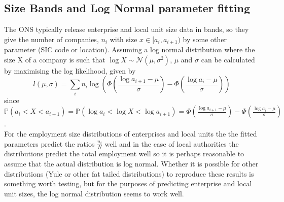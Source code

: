 \documentclass[a4paper,10pt]{article}
\begin{document}
\subsection{Size Bands and Log Normal parameter fitting}
\label{ONS size dist parameter fitting}
The ONS typically release enterprise and local unit size data in bands, so they give the number of companies, $n_i$ with size $x \in [a_i, a_{i+1})$ by some other parameter (SIC code or location). Assuming a log normal distribution where the size X of a company is such that $\log X \sim \mathcal{N}(\mu, \sigma^2)$, $\mu$ and $\sigma$ can be calculated by maximising the log likelihood, given by
\begin{equation}
 l(\mu, \sigma) = \sum_i n_i \log \left( \Phi \left( \frac{\log a_{i + 1} - \mu}{\sigma} \right) - \Phi \left( \frac{\log a_{i} - \mu}{\sigma} \right) \right)
\end{equation}
since $\mathbb{P}(a_i < X < a_{i + 1}) = \mathbb{P}(\log a_i < \log X < \log a_{i + 1}) = \Phi \left( \frac{\log a_{i + 1} - \mu}{\sigma} \right) - \Phi \left( \frac{\log a_{i} - \mu}{\sigma} \right)$. \\
For the employment size distributions of enterprises and local units the the fitted parameters predict the ratios $\frac{n_i}{N}$ well and in the case of local authorities the distributions predict the total employment well so it is perhaps reasonable to assume that the actual distribution is log normal. Whether it is possible for other distributions (Yule or other fat tailed distributions) to reproduce these results is something worth testing, but for the purposes of predicting enterprise and local unit sizes, the log normal distribution seems to work well.
\end{document}
